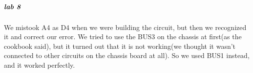 \subparagraph{lab 8}
We mistook A4 as D4 when we were building the circuit, but then we recognized it and correct our error.
We tried to use the BUS3 on the chassis at first(as the cookbook said), but it turned out that it is not working(we thought it wasn't connected to other circuits on the chassis board at all). So we used BUS1 instead, and it worked perfectly.